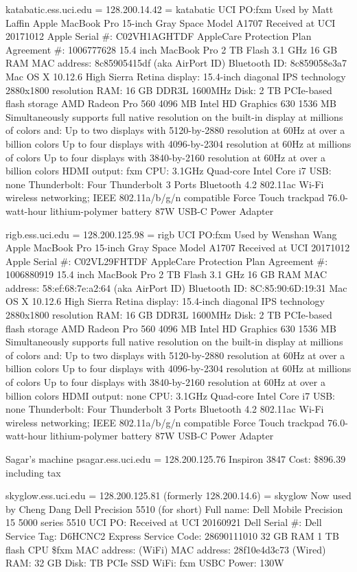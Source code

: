 \documentclass[12pt,twoside]{article}
\begin{document}
katabatic.ess.uci.edu = 128.200.14.42 = katabatic
UCI PO:fxm
Used by Matt Laffin
Apple MacBook Pro 15-inch Gray Space
Model A1707
Received at UCI 20171012
Apple Serial \#: C02VH1AGHTDF
AppleCare Protection Plan Agreement \#: 1006777628
15.4 inch MacBook Pro
2 TB Flash
3.1 GHz
16 GB RAM
MAC address: 8c85905415df (aka AirPort ID)
Bluetooth ID: 8c859058e3a7
Mac OS X 10.12.6 High Sierra
Retina display: 15.4-inch diagonal
IPS technology 2880x1800 resolution
RAM: 16 GB DDR3L 1600MHz
Disk: 2 TB PCIe-based flash storage
AMD Radeon Pro 560 4096 MB Intel HD Graphics 630 1536 MB
Simultaneously supports full native resolution on the built-in display at millions of colors and:
Up to two displays with 5120-by-2880 resolution at 60Hz at over a billion colors
Up to four displays with 4096-by-2304 resolution at 60Hz at millions of colors
Up to four displays with 3840-by-2160 resolution at 60Hz at over a billion colors
HDMI output: fxm
CPU: 3.1GHz Quad-core Intel Core i7
USB: none
Thunderbolt: Four Thunderbolt 3 Ports
Bluetooth 4.2
802.11ac Wi-Fi wireless networking; IEEE 802.11a/b/g/n compatible
Force Touch trackpad
76.0-watt-hour lithium-polymer battery
87W USB-C Power Adapter

rigb.ess.uci.edu = 128.200.125.98 = rigb
UCI PO:fxm
Used by Wenshan Wang
Apple MacBook Pro 15-inch Gray Space
Model A1707
Received at UCI 20171012
Apple Serial \#: C02VL29FHTDF
AppleCare Protection Plan Agreement \#: 1006880919
15.4 inch MacBook Pro
2 TB Flash
3.1 GHz
16 GB RAM
MAC address: 58:ef:68:7e:a2:64 (aka AirPort ID)
Bluetooth ID: 8C:85:90:6D:19:31
Mac OS X 10.12.6 High Sierra
Retina display: 15.4-inch diagonal
IPS technology 2880x1800 resolution
RAM: 16 GB DDR3L 1600MHz
Disk: 2 TB PCIe-based flash storage
AMD Radeon Pro 560 4096 MB Intel HD Graphics 630 1536 MB
Simultaneously supports full native resolution on the built-in display at millions of colors and:
Up to two displays with 5120-by-2880 resolution at 60Hz at over a billion colors
Up to four displays with 4096-by-2304 resolution at 60Hz at millions of colors
Up to four displays with 3840-by-2160 resolution at 60Hz at over a billion colors
HDMI output: none
CPU: 3.1GHz Quad-core Intel Core i7
USB: none
Thunderbolt: Four Thunderbolt 3 Ports
Bluetooth 4.2
802.11ac Wi-Fi wireless networking; IEEE 802.11a/b/g/n compatible
Force Touch trackpad
76.0-watt-hour lithium-polymer battery
87W USB-C Power Adapter

Sagar's machine
psagar.ess.uci.edu = 128.200.125.76
Inspiron 3847
Cost: \$896.39 including tax

skyglow.ess.uci.edu = 128.200.125.81 (formerly 128.200.14.6) = skyglow
Now used by Cheng Dang
Dell Precision 5510 (for short)
Full name: Dell Mobile Precision 15 5000 series 5510
UCI PO: 
Received at UCI 20160921
Dell Serial \#: 
Dell Service Tag: D6HCNC2
Express Service Code: 28690111010
32 GB RAM
1 TB flash
CPU 
\$fxm
MAC address:  (WiFi)
MAC address: 28f10e4d3c73 (Wired)
RAM: 32 GB 
Disk:  TB PCIe SSD
WiFi: fxm
USBC
Power: 130W
\end{document}
